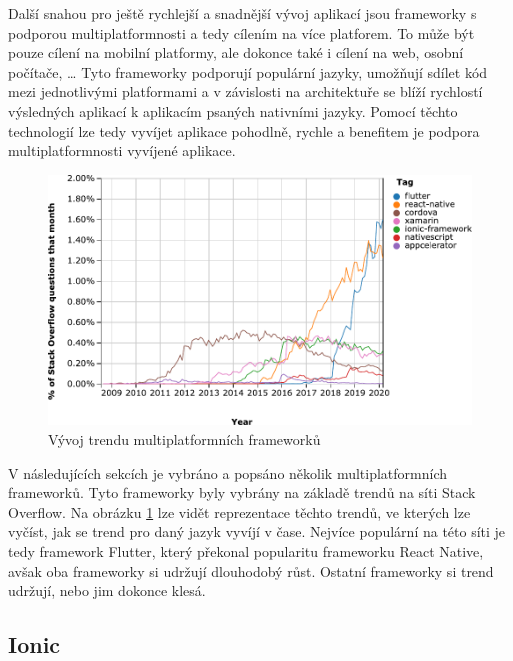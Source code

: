 Další snahou pro ještě rychlejší a snadnější vývoj aplikací jsou frameworky
s podporou multiplatformnosti a tedy cílením na více platforem.
\cite{hackernoon_flutter}
To může být pouze cílení na mobilní platformy,
ale dokonce také i cílení na web, osobní počítače, \dots{}
Tyto frameworky podporují populární jazyky,
umožňují sdílet kód mezi jednotlivými platformami
a v závislosti na architektuře se blíží rychlostí výsledných aplikací
k aplikacím psaných nativními jazyky.
Pomocí těchto technologií lze tedy vyvíjet aplikace pohodlně, rychle
a benefitem  je podpora multiplatformnosti vyvíjené aplikace.
\cite{dashmagazine_mobile_frameworks}

\begin{figure}[ht!]
    \centering
    \includegraphics[width=\linewidth]{assets/technology-research/framework/popularity.pdf}
    \caption{Vývoj trendu multiplatformních frameworků
    \cite{framework_popularity}}
    \label{fig:framework_popularity}
\end{figure}

V následujících sekcích je vybráno a popsáno několik multiplatformních
frameworků.
Tyto frameworky byly vybrány na základě trendů \cite{framework_popularity}
na síti Stack Overflow.
Na obrázku \ref{fig:framework_popularity} lze vidět reprezentace těchto trendů,
ve kterých lze vyčíst,
jak se trend pro daný jazyk vyvíjí v čase.
Nejvíce populární na této síti je tedy framework Flutter,
který překonal popularitu frameworku React Native,
avšak oba frameworky si udržují dlouhodobý růst.
Ostatní frameworky si trend udržují,
nebo jim dokonce klesá.

\subsection{Ionic}

